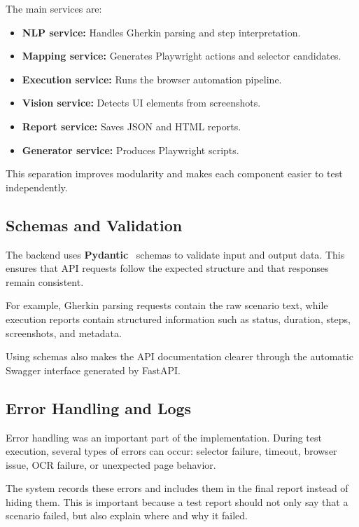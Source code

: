 The main services are:

\begin{itemize}
	\item \textbf{NLP service:} Handles Gherkin parsing and step interpretation.
	\item \textbf{Mapping service:} Generates Playwright actions and selector candidates.
	\item \textbf{Execution service:} Runs the browser automation pipeline.
	\item \textbf{Vision service:} Detects UI elements from screenshots.
	\item \textbf{Report service:} Saves JSON and HTML reports.
	\item \textbf{Generator service:} Produces Playwright scripts.
\end{itemize}

This separation improves modularity and makes each component easier to test independently.

\subsection{Schemas and Validation}
\label{subsec:schemas_validation}

The backend uses \textbf{Pydantic}~\cite{pydantic_docs} schemas to validate input and output data. This ensures that API requests follow the expected structure and that responses remain consistent.

For example, Gherkin parsing requests contain the raw scenario text, while execution reports contain structured information such as status, duration, steps, screenshots, and metadata.

Using schemas also makes the API documentation clearer through the automatic Swagger interface generated by FastAPI.

\subsection{Error Handling and Logs}
\label{subsec:error_handling_logs}

Error handling was an important part of the implementation. During test execution, several types of errors can occur: selector failure, timeout, browser issue, OCR failure, or unexpected page behavior.

The system records these errors and includes them in the final report instead of hiding them. This is important because a test report should not only say that a scenario failed, but also explain where and why it failed.

